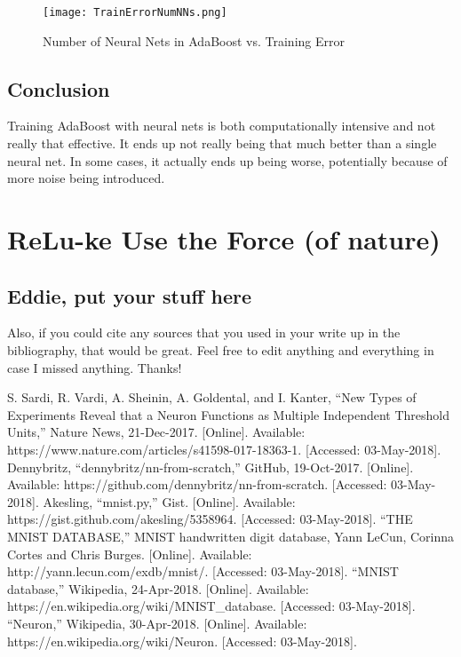 \documentclass[conference]{IEEEtran}
\begin{document}
\begin{figure}[h]
\centerline{\texttt{[image: TrainErrorNumNNs.png]}}
\caption{Number of Neural Nets in AdaBoost vs. Training Error}
\label{fig}
\end{figure}

\subsection{Conclusion}
Training AdaBoost with neural nets is both computationally intensive and not really that effective. It ends up not really being that much better than a single neural net. In some cases, it actually ends up being worse, potentially because of more noise being introduced.

\section{ReLu-ke Use the Force (of nature)}
\subsection{Eddie, put your stuff here}
Also, if you could cite any sources that you used in your write up in the bibliography, that would be great. Feel free to edit anything and everything in case I missed anything. Thanks!

\begin{thebibliography}{00}
 S. Sardi, R. Vardi, A. Sheinin, A. Goldental, and I. Kanter, “New Types of Experiments Reveal that a Neuron Functions as Multiple Independent Threshold Units,” Nature News, 21-Dec-2017. [Online]. Available: https://www.nature.com/articles/s41598-017-18363-1. [Accessed: 03-May-2018].
 Dennybritz, “dennybritz/nn-from-scratch,” GitHub, 19-Oct-2017. [Online]. Available: https://github.com/dennybritz/nn-from-scratch. [Accessed: 03-May-2018].
 Akesling, “mnist.py,” Gist. [Online]. Available: https://gist.github.com/akesling/5358964. [Accessed: 03-May-2018].
 “THE MNIST DATABASE,” MNIST handwritten digit database, Yann LeCun, Corinna Cortes and Chris Burges. [Online]. Available: http://yann.lecun.com/exdb/mnist/. [Accessed: 03-May-2018].
 “MNIST database,” Wikipedia, 24-Apr-2018. [Online]. Available: https://en.wikipedia.org/wiki/MNIST\_database. [Accessed: 03-May-2018].
 “Neuron,” Wikipedia, 30-Apr-2018. [Online]. Available: https://en.wikipedia.org/wiki/Neuron. [Accessed: 03-May-2018].

\end{thebibliography}
\end{document}
